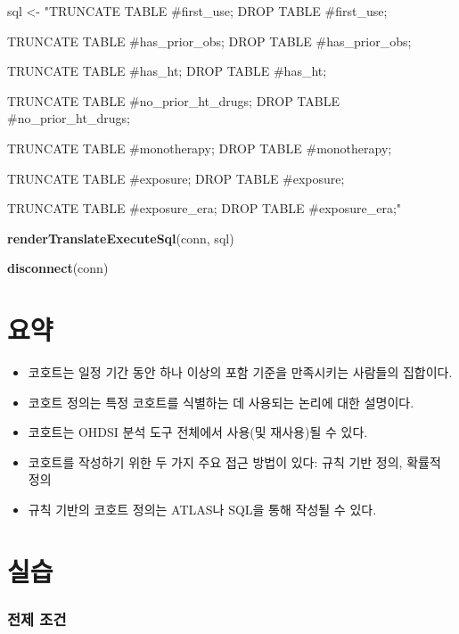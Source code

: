 \documentclass[11pt]{book}
\newenvironment{Shaded}{\begin{snugshade}}{\end{snugshade}}
\newcommand{\KeywordTok}[1]{\textcolor[rgb]{0.13,0.29,0.53}{\textbf{#1}}}
\newcommand{\StringTok}[1]{\textcolor[rgb]{0.31,0.60,0.02}{#1}}
\newcommand{\NormalTok}[1]{#1}
\theoremstyle{definition}
\theoremstyle{definition}
\theoremstyle{definition}
\theoremstyle{remark}
\let\BeginKnitrBlock\begin \let\EndKnitrBlock\end
\begin{document}
\begin{Shaded}
\begin{Highlighting}[]
\NormalTok{sql <-}\StringTok{ "TRUNCATE TABLE #first_use;}
\StringTok{DROP TABLE #first_use;}

\StringTok{TRUNCATE TABLE #has_prior_obs;}
\StringTok{DROP TABLE #has_prior_obs;}

\StringTok{TRUNCATE TABLE #has_ht;}
\StringTok{DROP TABLE #has_ht;}

\StringTok{TRUNCATE TABLE #no_prior_ht_drugs;}
\StringTok{DROP TABLE #no_prior_ht_drugs;}

\StringTok{TRUNCATE TABLE #monotherapy;}
\StringTok{DROP TABLE #monotherapy;}

\StringTok{TRUNCATE TABLE #exposure;}
\StringTok{DROP TABLE #exposure;}

\StringTok{TRUNCATE TABLE #exposure_era;}
\StringTok{DROP TABLE #exposure_era;"}

\KeywordTok{renderTranslateExecuteSql}\NormalTok{(conn, sql)}

\KeywordTok{disconnect}\NormalTok{(conn)}
\end{Highlighting}
\end{Shaded}

\section{요약}\label{-8}

\BeginKnitrBlock{rmdsummary}
\begin{itemize}
\item
  코호트는 일정 기간 동안 하나 이상의 포함 기준을 만족시키는 사람들의
  집합이다.
\item
  코호트 정의는 특정 코호트를 식별하는 데 사용되는 논리에 대한 설명이다.
\item
  코호트는 OHDSI 분석 도구 전체에서 사용(및 재사용)될 수 있다.
\item
  코호트를 작성하기 위한 두 가지 주요 접근 방법이 있다: 규칙 기반 정의,
  확률적 정의
\item
  규칙 기반의 코호트 정의는 ATLAS나 SQL을 통해 작성될 수 있다.
\end{itemize}
\EndKnitrBlock{rmdsummary}

\section{실습}

\subsubsection*{전제 조건}\label{--2}
\end{document}
